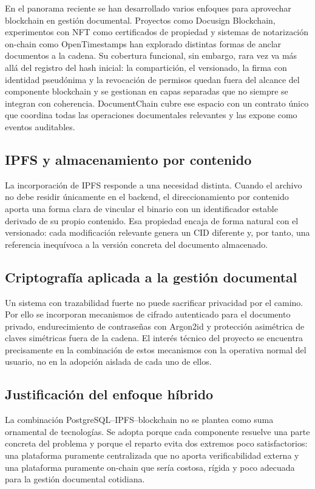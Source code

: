 \documentclass[11pt, a4paper]{article}
\begin{document}
En el panorama reciente se han desarrollado varios enfoques para aprovechar blockchain en gestión documental. Proyectos como Docusign Blockchain, experimentos con NFT como certificados de propiedad y sistemas de notarización on-chain como OpenTimestamps han explorado distintas formas de anclar documentos a la cadena. Su cobertura funcional, sin embargo, rara vez va más allá del registro del hash inicial: la compartición, el versionado, la firma con identidad pseudónima y la revocación de permisos quedan fuera del alcance del componente blockchain y se gestionan en capas separadas que no siempre se integran con coherencia. DocumentChain cubre ese espacio con un contrato único que coordina todas las operaciones documentales relevantes y las expone como eventos auditables.

\subsection{IPFS y almacenamiento por contenido}

La incorporación de IPFS responde a una necesidad distinta. Cuando el archivo no debe residir únicamente en el backend, el direccionamiento por contenido aporta una forma clara de vincular el binario con un identificador estable derivado de su propio contenido. Esa propiedad encaja de forma natural con el versionado: cada modificación relevante genera un CID diferente y, por tanto, una referencia inequívoca a la versión concreta del documento almacenado.

\subsection{Criptografía aplicada a la gestión documental}

Un sistema con trazabilidad fuerte no puede sacrificar privacidad por el camino. Por ello se incorporan mecanismos de cifrado autenticado para el documento privado, endurecimiento de contraseñas con Argon2id y protección asimétrica de claves simétricas fuera de la cadena. El interés técnico del proyecto se encuentra precisamente en la combinación de estos mecanismos con la operativa normal del usuario, no en la adopción aislada de cada uno de ellos.

\subsection{Justificación del enfoque híbrido}

La combinación PostgreSQL--IPFS--blockchain no se plantea como suma ornamental de tecnologías. Se adopta porque cada componente resuelve una parte concreta del problema y porque el reparto evita dos extremos poco satisfactorios: una plataforma puramente centralizada que no aporta verificabilidad externa y una plataforma puramente on-chain que sería costosa, rígida y poco adecuada para la gestión documental cotidiana.
\end{document}

